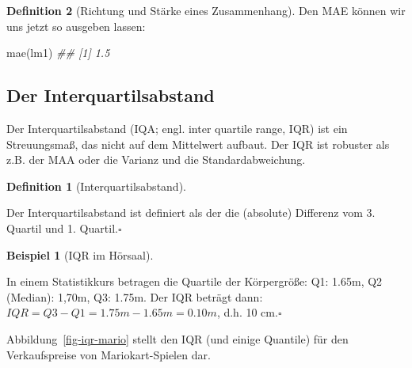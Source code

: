 \documentclass[
  a4paper,
  DIV=11]{scrreprt}
\newenvironment{Shaded}{\begin{snugshade}}{\end{snugshade}}
\newcommand{\DocumentationTok}[1]{\textcolor[rgb]{0.37,0.37,0.37}{\textit{#1}}}
\newcommand{\FunctionTok}[1]{\textcolor[rgb]{0.28,0.35,0.67}{#1}}
\newcommand{\NormalTok}[1]{\textcolor[rgb]{0.00,0.23,0.31}{#1}}
\theoremstyle{definition}
\theoremstyle{definition}
\newtheorem{example}{Beispiel}[chapter]
\theoremstyle{definition}
\newtheorem{definition}{Definition}[chapter]
\theoremstyle{remark}
\begin{document}
\begin{definition}[Richtung und Stärke eines
Zusammenhang]
Den MAE können wir uns jetzt so ausgeben lassen:

\begin{Shaded}
\begin{Highlighting}[]
\FunctionTok{mae}\NormalTok{(lm1)}
\DocumentationTok{\#\# [1] 1.5}
\end{Highlighting}
\end{Shaded}

\subsection{Der Interquartilsabstand}\label{der-interquartilsabstand}

Der Interquartilsabstand (IQA; engl. inter quartile range, IQR) ist ein
Streuungsmaß, das nicht auf dem Mittelwert aufbaut. Der IQR ist robuster
als z.B. der MAA oder die Varianz und die Standardabweichung.

\begin{definition}[Interquartilsabstand]\protect\hypertarget{def-iqr}{}\label{def-iqr}

Der Interquartilsabstand ist definiert als der die (absolute) Differenz
vom 3. Quartil und 1. Quartil.\(\square\)

\end{definition}

\begin{example}[IQR im
Hörsaal]\protect\hypertarget{exm-iqr}{}\label{exm-iqr}

In einem Statistikkurs betragen die Quartile der Körpergröße: Q1: 1.65m,
Q2 (Median): 1,70m, Q3: 1.75m. Der IQR beträgt dann:
\(IQR = Q3-Q1 = 1.75m - 1.65m = 0.10m\), d.h. 10 cm.\(\square\)

\end{example}

Abbildung~\ref{fig-iqr-mario} stellt den IQR (und einige Quantile) für
den Verkaufspreise von Mariokart-Spielen dar.

\begin{figure}

\end{figure}
\end{definition}
\end{document}
